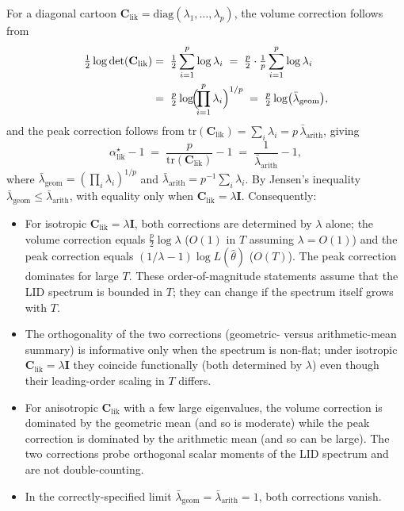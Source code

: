 \documentclass[11pt]{article}
\begin{document}
For a diagonal cartoon $\mathbf C_{\mathrm{lik}} = \mathrm{diag}(\lambda_1,\ldots,\lambda_p)$, the volume correction follows from
\begin{align}
\tfrac{1}{2}\log\det(\mathbf C_{\mathrm{lik}})
&=\;
\tfrac{1}{2}\sum_{i=1}^p \log\lambda_i
\;=\;
\tfrac{p}{2}\cdot\tfrac{1}{p}\sum_{i=1}^p \log\lambda_i
\notag\\
&=\;
\tfrac{p}{2}\log\!\Bigl(\!\prod_{i=1}^p \lambda_i\Bigr)^{1/p}
\;=\;
\tfrac{p}{2}\log\bigl(\bar\lambda_{\mathrm{geom}}\bigr),
\label{eq:vol-geom}
\end{align}
and the peak correction follows from $\mathrm{tr}(\mathbf C_{\mathrm{lik}}) = \sum_i\lambda_i = p\,\bar\lambda_{\mathrm{arith}}$, giving
\begin{equation}
\alpha^\star_{\mathrm{lik}} - 1
\;=\;
\frac{p}{\mathrm{tr}(\mathbf C_{\mathrm{lik}})} - 1
\;=\;
\frac{1}{\bar\lambda_{\mathrm{arith}}} - 1,
\label{eq:peak-arith}
\end{equation}
where $\bar\lambda_{\mathrm{geom}} = (\prod_i \lambda_i)^{1/p}$ and $\bar\lambda_{\mathrm{arith}} = p^{-1}\sum_i \lambda_i$. By Jensen's inequality $\bar\lambda_{\mathrm{geom}} \leq \bar\lambda_{\mathrm{arith}}$, with equality only when $\mathbf C_{\mathrm{lik}} = \lambda\mathbf I$. Consequently:
\begin{itemize}
\item For isotropic $\mathbf C_{\mathrm{lik}} = \lambda\mathbf I$, both corrections are determined by $\lambda$ alone; the volume correction equals $\tfrac{p}{2}\log\lambda$ ($O(1)$ in $T$ assuming $\lambda = O(1)$) and the peak correction equals $(1/\lambda - 1)\log L(\hat\theta)$ ($O(T)$). The peak correction dominates for large $T$. These order-of-magnitude statements assume that the LID spectrum is bounded in $T$; they can change if the spectrum itself grows with $T$.
\item The orthogonality of the two corrections (geometric- versus arithmetic-mean summary) is informative only when the spectrum is non-flat; under isotropic $\mathbf C_{\mathrm{lik}} = \lambda\mathbf I$ they coincide functionally (both determined by $\lambda$) even though their leading-order scaling in $T$ differs.
\item For anisotropic $\mathbf C_{\mathrm{lik}}$ with a few large eigenvalues, the volume correction is dominated by the geometric mean (and so is moderate) while the peak correction is dominated by the arithmetic mean (and so can be large). The two corrections probe orthogonal scalar moments of the LID spectrum and are not double-counting.
\item In the correctly-specified limit $\bar\lambda_{\mathrm{geom}} = \bar\lambda_{\mathrm{arith}} = 1$, both corrections vanish.
\end{itemize}
\end{document}
